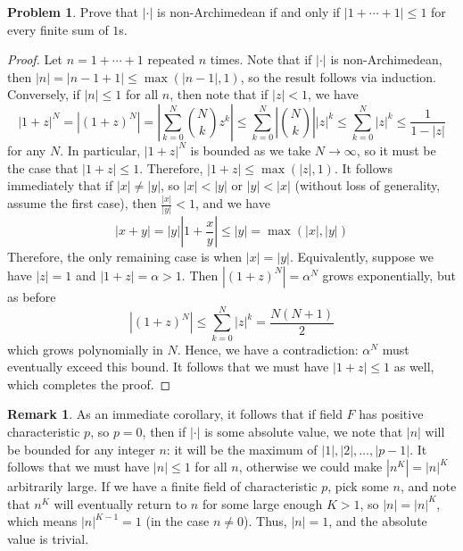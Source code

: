 \documentclass[aps,pra,showpacs,notitlepage,onecolumn,superscriptaddress,nofootinbib,oneside,10pt]{article}
\theoremstyle{definition}
\newtheorem{remark}{Remark}[section]
\newtheorem{problem}{Problem}[section]
\begin{document}
\begin{problem}
  Prove that $|\cdot|$ is non-Archimedean if and only if $|1 + \cdots + 1| \leq 1$ for every finite sum of $1$s.
  \end{problem}
\begin{proof}
  Let $n = 1 + \cdots + 1$ repeated $n$ times. Note that if $|\cdot|$ is non-Archimedean, then $|n| = |n - 1 + 1| \leq \max(|n - 1|, 1)$, so the result follows via induction.
  Conversely, if $|n| \leq 1$ for all $n$, then note that if $|z| < 1$, we have
  \begin{equation}
    |1 + z|^N = |(1 + z)^N| = \left| \sum_{k = 0}^{N} {N \choose k} z^k \right| \leq \sum_{k = 0}^{N} \left| {N \choose k} \right| |z|^k \leq \sum_{k = 0}^{N} |z|^k \leq \frac{1}{1 - |z|}
    \end{equation}
  for any $N$. In particular, $|1 + z|^N$ is bounded as we take $N \to \infty$, so it must be the case that $|1 + z| \leq 1$. Therefore, $|1 + z| \leq \max(|z|, 1)$. It follows immediately that
  if $|x| \neq |y|$, so $|x| < |y|$ or $|y| < |x|$ (without loss of generality, assume the first case), then $\frac{|x|}{|y|} < 1$, and we have
  \begin{equation}
    |x + y| = |y| \left| 1 + \frac{x}{y} \right| \leq |y| = \max(|x|, |y|)
    \end{equation}
  Therefore, the only remaining case is when $|x| = |y|$. Equivalently, suppose we have $|z| = 1$ and $|1 + z| = \alpha > 1$. Then $|(1 + z)^N| = \alpha^N$ grows exponentially, but as before
  \begin{equation}
    |(1 + z)^N| \leq \sum_{k = 0}^{N} |z|^k = \frac{N (N + 1)}{2}
    \end{equation}
  which grows polynomially in $N$. Hence, we have a contradiction: $\alpha^N$ must eventually exceed this bound. It follows that we must have $|1 + z| \leq 1$ as well, which completes the proof.
  \end{proof}

\begin{remark}
  As an immediate corollary, it follows that if field $F$ has positive characteristic $p$, so $p = 0$, then if $|\cdot|$ is some absolute value, we note that $|n|$ will be bounded
  for any integer $n$: it will be the maximum of $|1|, |2|, \dots, |p - 1|$. It follows that we must have $|n| \leq 1$ for all $n$, otherwise we could make $|n^K| = |n|^K$ arbitrarily large.
  If we have a finite field of characteristic $p$, pick some $n$, and note that $n^K$ will eventually return to $n$ for some large enough $K > 1$, so $|n| = |n|^K$, which means $|n|^{K - 1} = 1$ (in the case $n \neq 0$).
  Thus, $|n| = 1$, and the absolute value is trivial.
  \end{remark}
\end{document}
